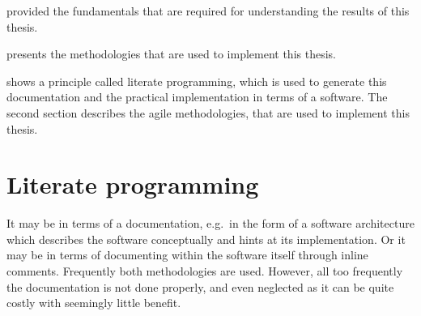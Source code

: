 \documentclass[%
    a4paper,    %
    justified,  %
    nobib,      %
    openany     %
]{tufte-book}
\makeatletter
\renewcommand{\label}[1]{\@tufte@label{##1}}%
\makeatother
\begin{document}
 provided the fundamentals that are required for
understanding the results of this thesis.

 presents the methodologies that are used to implement
this thesis.

 shows a principle called literate
programming, which is used to generate this documentation and the practical
implementation in terms of a software. The second section describes the agile
methodologies, that are used to implement this thesis.

\section{Literate programming}
\label{sec:literate-programming}

 It may be in terms of
a documentation, e.g.\ in the form of a software architecture which
describes the software conceptually and hints at its implementation. Or it may
be in terms of documenting within the software itself through inline comments.
Frequently both methodologies are used. However, all too
frequently the documentation is not done properly, and even neglected as it can
be quite costly with seemingly little benefit.
\end{document}
